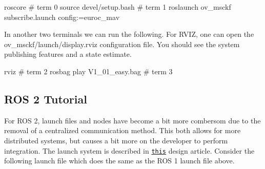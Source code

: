 \begin{DoxyCode}
roscore # term 0
source devel/setup.bash # term 1
roslaunch ov\_msckf subscribe.launch config:=euroc\_mav
\end{DoxyCode}


In another two terminals we can run the following. For R\+V\+IZ, one can open the {\ttfamily ov\+\_\+msckf/launch/display.\+rviz} configuration file. You should see the system publishing features and a state estimate.


\begin{DoxyCode}
rviz # term 2
rosbag play V1\_01\_easy.bag # term 3
\end{DoxyCode}
\hypertarget{gs-tutorial_gs-tutorial-ros2}{}\subsection{R\+O\+S 2 Tutorial}\label{gs-tutorial_gs-tutorial-ros2}
For R\+OS 2, launch files and nodes have become a bit more combersom due to the removal of a centralized communication method. This both allows for more distributed systems, but causes a bit more on the developer to perform integration. The launch system is described in \href{https://design.ros2.org/articles/roslaunch.html}{\tt this} design article. Consider the following launch file which does the same as the R\+OS 1 launch file above.

